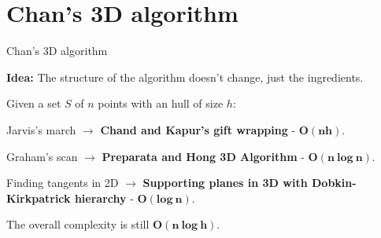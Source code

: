 \documentclass[14pt]{beamer}
\begin{document}
\section{Chan's 3D algorithm}
\begin{frame}{Chan's 3D algorithm}
	\begin{center}
		\vspace{-2mm}
		\begin{fullpageitemize}
			\item<1->[\rtarrow] \textbf{Idea:} The structure of the algorithm doesn't change, just the ingredients.
			
			\fontsize{12}{14}\notosansfont
			\begin{sublist}
				\vspace{2mm}
				\item<2->[] Given a set $S$ of $n$ points with an hull of size $h$:
				\vspace{2mm}
				\item<3-> Jarvis's march $\longrightarrow$ \textbf{Chand and Kapur's gift wrapping} - \textcolor{colorgreen}{$\bm{O(nh)}$}.
				\item<4-> Graham's scan $\longrightarrow$ \textbf{Preparata and Hong 3D Algorithm} - \textcolor{colorgreen}{$\bm{O(n\ log\ n)}$}.
				\item<5-> Finding tangents in 2D $\longrightarrow$ \textbf{Supporting planes in 3D with Dobkin-Kirkpatrick hierarchy} - \textcolor{colorgreen}{$\bm{O(log\ n)}$}.
			\end{sublist}		
			
			\item<6-> The overall complexity is still \textcolor{colorgreen}{$\bm{O(n\ log\ h)}$}.
		\end{fullpageitemize}	
	\end{center}
\end{frame}
\end{document}
